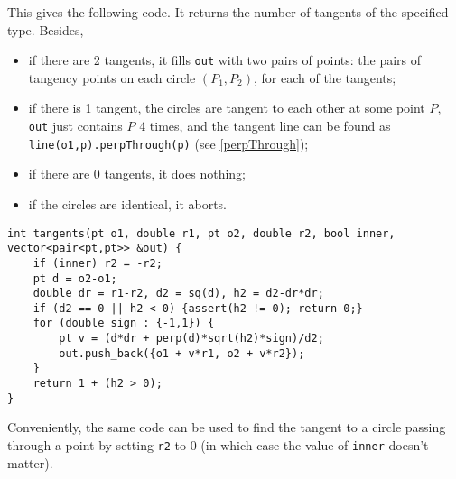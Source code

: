 This gives the following code. It returns the number of tangents of the specified type. Besides,
\begin{itemize}
\item if there are 2 tangents, it fills \lstinline|out| with two pairs of points: the pairs of tangency points on each circle $(P_1,P_2)$, for each of the tangents;
\item if there is 1 tangent, the circles are tangent to each other at some point $P$, \lstinline|out| just contains $P$ 4 times, and the tangent line can be found as \lstinline|line(o1,p).perpThrough(p)| (see \ref{perpThrough});
\item if there are 0 tangents, it does nothing;
\item if the circles are identical, it aborts.
\end{itemize}
\begin{lstlisting}
int tangents(pt o1, double r1, pt o2, double r2, bool inner, vector<pair<pt,pt>> &out) {
    if (inner) r2 = -r2;
    pt d = o2-o1;
    double dr = r1-r2, d2 = sq(d), h2 = d2-dr*dr;
    if (d2 == 0 || h2 < 0) {assert(h2 != 0); return 0;}
    for (double sign : {-1,1}) {
        pt v = (d*dr + perp(d)*sqrt(h2)*sign)/d2;
        out.push_back({o1 + v*r1, o2 + v*r2});
    }
    return 1 + (h2 > 0);
}
\end{lstlisting}

Conveniently, the same code can be used to find the tangent to a circle passing through a point by setting \lstinline|r2| to 0 (in which case the value of \lstinline|inner| doesn't matter).

